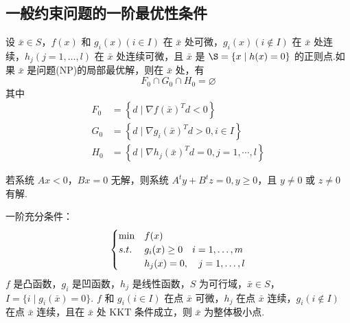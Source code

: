 \subsection{一般约束问题的一阶最优性条件}
\begin{theorem}
    设 $\bar{x} \in S$，$f(x)$ 和 $g_i(x)(i\in I)$ 在 $\bar{x}$ 处可微，$g_i(x) (i \notin I)$ 在 $\bar{x}$ 处连续，$h_j(j = 1, \dots, l)$ 在 $\bar{x}$ 处连续可微，且 $\bar{x}$ 是 $\S = \{x \mid h(x) = 0\}$ 的正则点.如果 $\bar{x}$ 是问题(NP)的局部最优解，则在 $\bar{x}$ 处，有\[F_{0} \cap G_{0} \cap H_{0}=\varnothing\]其中
    \begin{align*}
        F_{0}&=\left\{d \mid \nabla f(\bar{x})^{T} d<0\right\} \\
        G_{0}&=\left\{d \mid \nabla g_{i}(\bar{x})^{T} d>0, i \in I\right\} \\
        H_{0}&=\left\{d \mid \nabla h_{j}(\bar{x})^{T} d=0, j=1, \cdots, l\right\}
    \end{align*}
\end{theorem}

\begin{theorem}
    若系统 $Ax < 0$，$Bx = 0$ 无解，则系统 $A^ty + B^tz = 0, y \ge 0$，且 $y \neq 0$ 或 $z \neq 0$ 有解.
\end{theorem}

\begin{note}
    一阶充分条件：\[\begin{cases}
        \min &f(x)\\
        s.t. &g_i(x) \ge 0 \quad i = 1, \dots, m\\
        &h_j(x) = 0, \quad j = 1, \dots, l
    \end{cases}\]
    $f$ 是凸函数，$g_i$ 是凹函数，$h_j$ 是线性函数，$S$ 为可行域，$\bar{x} \in S$，$I = \{i \mid g_i(\bar{x}) = 0\}$. $f$ 和 $g_i(i \in I)$ 在点 $\bar{x}$ 可微，$h_j$ 在点 $\bar{x}$ 连续，$g_i(i \notin I)$ 在点 $\bar{x}$ 连续，且在 $\bar{x}$ 处 KKT 条件成立，则 $\bar{x}$ 为整体极小点.
\end{note}
